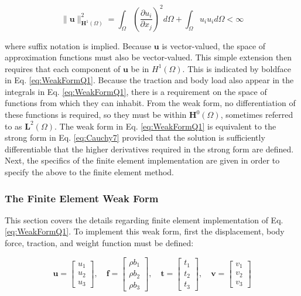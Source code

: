 \documentclass[10pt]{article}
\begin{document}
\begin{equation}
\|\textbf{u}\|^2_{\textbf{H}^1(\Omega)}=\int_{\Omega}\left(\frac{\partial u_i}{\partial x_j}\right)^2d\Omega+\int_{\Omega}u_iu_id\Omega<\infty
\end{equation}

where suffix notation is implied. Because \(\textbf{u}\) is vector-valued, the space of approximation functions must also be vector-valued. This simple extension then requires that each component of \(\textbf{u}\) be in \(H^1(\Omega)\). This is indicated by boldface in Eq. \eqref{eq:WeakFormQ1}. Because the traction and body load also appear in the integrals in Eq. \eqref{eq:WeakFormQ1}, there is a requirement on the space of functions from which they can inhabit. From the weak form, no differentiation of these functions is required, so they must be within \(\textbf{H}^0(\Omega)\), sometimes referred to as \(\textbf{L}^2(\Omega)\). The weak form in Eq. \eqref{eq:WeakFormQ1} is equivalent to the strong form in Eq. \eqref{eq:Cauchy7} provided that the solution is sufficiently differentiable that the higher derivatives required in the strong form are defined. Next, the specifics of the finite element implementation are given in order to specify the above to the finite element method.

\subsubsection{The Finite Element Weak Form}

This section covers the details regarding finite element implementation of Eq. \eqref{eq:WeakFormQ1}. To implement this weak form, first the displacement, body force, traction, and weight function must be defined:

\begin{equation}
\textbf{u}=\begin{bmatrix}u_1\\u_2\\u_3\end{bmatrix},\quad\textbf{f}=\begin{bmatrix}\rho b_1\\\rho b_2\\\rho b_3\end{bmatrix},\quad\textbf{t}=\begin{bmatrix}t_1\\t_2\\t_3\end{bmatrix},\quad\textbf{v}=\begin{bmatrix}v_1\\v_2\\v_3\end{bmatrix}
\end{equation}
\end{document}
